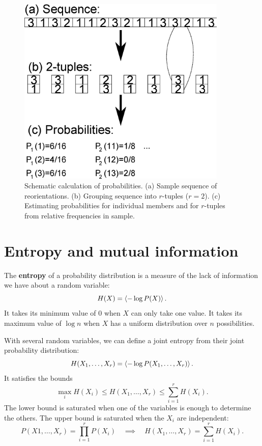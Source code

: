 \documentclass[12pt]{article}
\begin{document}
\begin{figure}
  \begin{center}
    \includegraphics[width=10cm]{schematic.eps}
  \end{center}
  \caption{Schematic calculation of probabilities. (a) Sample sequence of reorientations. (b) Grouping sequence into $r$-tuples ($r=2$). (c) Estimating probabilities for individual members and for $r$-tuples from relative frequencies in sample.} \label{fig:schematic}
\end{figure}



\section{Entropy and mutual information}\label{sec:entropy}

The \textbf{entropy} of a probability distribution is a measure of the lack of information we have about a random variable:
%
\begin{equation}\label{eq:ent}
  H(X) = \left\langle -\log P(X) \right\rangle.
\end{equation}
%
It takes its minimum value of $0$ when $X$ can only take one value. It takes its maximum value of $\log n$ when $X$ has a uniform distribution over $n$ possibilities.

With several random variables, we can define a joint entropy from their joint probability distribution:
%
\begin{equation}\label{eq:jointent}
  H(X_1,\ldots,X_r) = \left\langle -\log P(X_1,\ldots,X_r) \right\rangle.
\end{equation}
%
It satisfies the bounds
%
\begin{equation}\label{eq:entbounds}
  \max_i H(X_i) \leq H(X_1,\ldots,X_r) \leq \sum_{i=1}^r H(X_i).
\end{equation}
%
The lower bound is saturated when one of the variables is enough to determine the others. The upper bound is saturated when the $X_i$ are independent:
%
\begin{equation}\label{eq:indent}
  P(X1,\ldots,X_r) = \prod_{i=1}^r P(X_i)
  \quad \implies \quad
  H(X_1,\ldots,X_r) = \sum_{i=1}^r H(X_i).
\end{equation}
%
\end{document}
